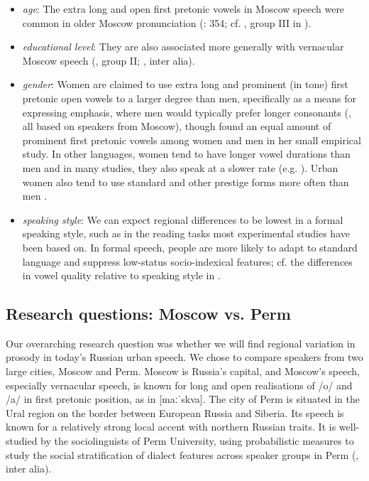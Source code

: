 \documentclass[output=paper]{langscibook}
\begin{document}
\begin{itemize}
\item \textit{age}: The extra long and open first pretonic vowels in Moscow speech were common in older Moscow pronunciation (\citealt{Lapteva1999}: 354; cf. \citealt{Vysotskij1973}, group III in ).
\item \textit{educational level}: They are also associated more generally with vernacular Moscow speech (\citealt{Vysotskij1973}, group II; \citealt{Rozanova1988}, inter alia). 
\item \textit{gender}: Women are claimed to use extra long and prominent (in tone) first pretonic open vowels to a larger degree than men, specifically as a means for expressing emphasis, where men would typically prefer longer consonants (\citealt{ZemskajaEtAl1987, Rozanova1988, Kasatkina2003}, all based on speakers from Moscow), though \citealt{Kasatkina2005} found an equal amount of prominent first pretonic vowels among women and men in her small empirical study. In other languages, women tend to have longer vowel durations than men and in many studies, they also speak at a slower rate (e.g. \citealt{SimpsonEricsdotter2003}). Urban women also tend to use standard and other prestige forms more often than men \citep{Labov2001}.
\item \textit{speaking style}: We can expect regional differences to be lowest in a formal speaking style, such as in the reading tasks most experimental studies have been based on. In formal speech, people are more likely to adapt to standard language and suppress low-status socio-indexical features; cf. the differences in vowel quality relative to speaking style in \citet{Erofeeva1993}.
\end{itemize}

\subsection{Research questions: Moscow vs. Perm}
\label{sec:post:1.3}
Our overarching research question was whether we will find regional variation in prosody in today’s Russian urban speech. We chose to compare speakers from two large cities, Moscow and Perm. Moscow is Russia’s capital, and Moscow’s speech, especially vernacular speech, is known for long and open realisations of \mbox{/o/} and \mbox{/a/} in first pretonic position, as in [maːˈskva]. The city of Perm is situated in the Ural region on the border between European Russia and Siberia. Its speech is known for a relatively strong local accent with northern Russian traits. It is well-studied by the sociolinguists of Perm University, using probabilistic measures to study the social stratification of dialect features across speaker groups in Perm (\citealt{Erofeeva1995, Erofeeva2005}, inter alia).
\end{document}
